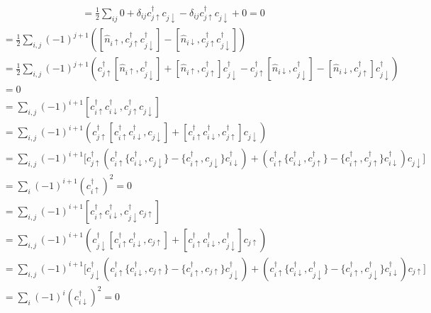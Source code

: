 \documentclass{article}
\begin{document}
\begin{enumerate}[a)]
\begin{align*}
&= \frac{1}{2} \sum_{ij} 0 + \delta_{ij} c_{j\uparrow}^\dagger c_{j \downarrow} - \delta_{ij} c_{j\uparrow}^\dagger c_{j \downarrow} + 0 = 0
\end{align*}
\begin{align*}
[\hat{S}_z, \hat{J}_+] &= \frac{1}{2} \sum_{i,j} (-1)^{j+1} ([\hat{n}_{i\uparrow}, c_{j\uparrow}^\dagger c_{j\downarrow}^\dagger] - [\hat{n}_{i\downarrow}, c_{j\uparrow}^\dagger c_{j \downarrow}^\dagger]) \\
&= \frac{1}{2} \sum_{i,j} (-1)^{j+1} ( c_{j\uparrow}^\dagger [\hat{n}_{i\uparrow}, c_{j\downarrow}^\dagger] + [\hat{n}_{i\uparrow}, c_{j\uparrow}^\dagger] c_{j\downarrow}^\dagger - c_{j\uparrow}^\dagger [\hat{n}_{i\downarrow}, c_{j\downarrow}^\dagger] - [\hat{n}_{i\downarrow}, c_{j\uparrow}^\dagger]c_{j\downarrow}^\dagger) \\
&= 0
\end{align*}
\begin{align*}
[\hat{J}_+, \hat{S}_+] &= \sum_{i,j} (-1)^{i+1} [c_{i\uparrow}^\dagger c_{i\downarrow}^\dagger, c_{j\uparrow}^\dagger c_{j\downarrow}] \\
&= \sum_{i,j} (-1)^{i+1}(c_{j\uparrow}^\dagger[c_{i\uparrow}^\dagger c_{i\downarrow}^\dagger, c_{j\downarrow}] + [c_{i\uparrow}^\dagger c_{i \downarrow}^\dagger, c_{j\uparrow}^\dagger] c_{j\downarrow}) \\
&= \sum_{i,j} (-1)^{i+1}\big[c_{j\uparrow}^\dagger (c_{i\uparrow}^\dagger \{ c_{i\downarrow}^\dagger, c_{j\downarrow} \} - \{c_{i\uparrow}^\dagger, c_{j\downarrow} \} c_{i\downarrow}^\dagger) + (c_{i\uparrow}^\dagger \{ c_{i\downarrow}^\dagger, c_{j\uparrow}^\dagger \} - \{ c_{i\uparrow}^\dagger, c_{j\uparrow}^\dagger\} c_{i\downarrow}^\dagger) c_{j\downarrow} \big] \\
&= \sum_{i} (-1)^{i+1} (c_{i\uparrow}^\dagger)^2 = 0
\end{align*}
\begin{align*}
[\hat{J}_+, \hat{S}_-] &= \sum_{i,j} (-1)^{i+1} [c_{i\uparrow}^\dagger c_{i\downarrow}^\dagger, c_{j\downarrow}^\dagger c_{j\uparrow}] \\
&= \sum_{i,j} (-1)^{i+1}(c_{j\downarrow}^\dagger[c_{i\uparrow}^\dagger c_{i\downarrow}^\dagger, c_{j\uparrow}] + [c_{i\uparrow}^\dagger c_{i\downarrow}^\dagger, c_{j\downarrow}^\dagger]c_{j\uparrow}) \\
&= \sum_{i,j} (-1)^{i+1}\big[c_{j\downarrow}^\dagger (c_{i\uparrow}^\dagger \{ c_{i\downarrow}^\dagger, c_{j\uparrow} \} - \{ c_{i\uparrow}^\dagger, c_{j\uparrow} \} c_{j\downarrow}^\dagger) + (c_{i\uparrow}^\dagger \{ c_{i\downarrow}^\dagger, c_{j\downarrow}^\dagger \} - \{c_{i\uparrow}^\dagger, c_{j\downarrow}^\dagger \} c_{i\downarrow}^\dagger) c_{j\uparrow} \big] \\
&= \sum_{i} (-1)^i (c_{i\downarrow}^\dagger)^2 = 0
\end{align*}
\end{enumerate}
\end{document}
